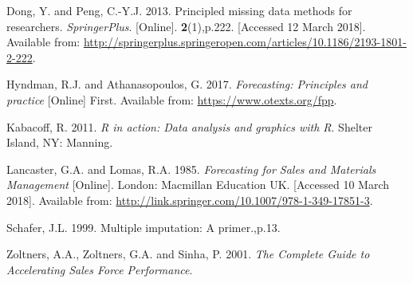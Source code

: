 \documentclass[11pt,]{article}
\begin{document}
\hypertarget{ref-dong_principled_2013}{}
Dong, Y. and Peng, C.-Y.J. 2013. Principled missing data methods for
researchers. \emph{SpringerPlus}. {[}Online{]}. \textbf{2}(1),p.222.
{[}Accessed 12 March 2018{]}. Available from:
\url{http://springerplus.springeropen.com/articles/10.1186/2193-1801-2-222}.

\hypertarget{ref-hyndman_forecasting:_2017}{}
Hyndman, R.J. and Athana­sopou­los, G. 2017. \emph{Forecasting:
Principles and practice} {[}Online{]} First. Available from:
\url{https://www.otexts.org/fpp}.

\hypertarget{ref-kabacoff_r_2011}{}
Kabacoff, R. 2011. \emph{R in action: Data analysis and graphics with
R}. Shelter Island, NY: Manning.

\hypertarget{ref-lancaster_forecasting_1985}{}
Lancaster, G.A. and Lomas, R.A. 1985. \emph{Forecasting for Sales and
Materials Management} {[}Online{]}. London: Macmillan Education UK.
{[}Accessed 10 March 2018{]}. Available from:
\url{http://link.springer.com/10.1007/978-1-349-17851-3}.

\hypertarget{ref-schafer_multiple_1999}{}
Schafer, J.L. 1999. Multiple imputation: A primer.,p.13.

\hypertarget{ref-zoltners_complete_2001}{}
Zoltners, A.A., Zoltners, G.A. and Sinha, P. 2001. \emph{The Complete
Guide to Accelerating Sales Force Performance}.
\end{document}
